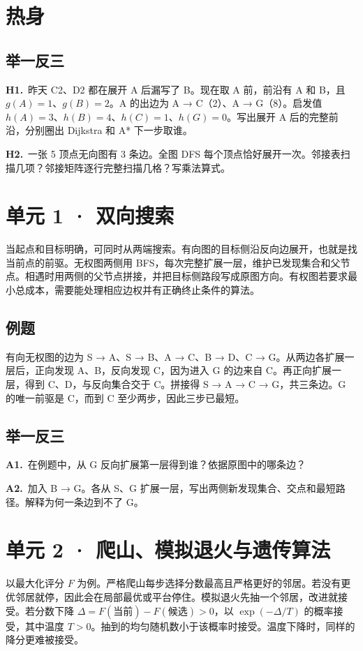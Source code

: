 \documentclass[UTF8,a4paper,11pt]{ctexart}
\newcommand{\CompactQuestion}[2]{\par\noindent\textbf{#1.}\ #2\par\vspace{.8em}}
\begin{document}
\section{热身}
\subsection{举一反三}
\CompactQuestion{H1}{昨天 C2、D2 都在展开 A 后漏写了 B。现在取 A 前，前沿有 A 和 B，且 $g(A)=1$、$g(B)=2$。A 的出边为 A → C（2）、A → G（8）。启发值 $h(A)=3$、$h(B)=4$、$h(C)=1$、$h(G)=0$。写出展开 A 后的完整前沿，分别圈出 Dijkstra 和 A* 下一步取谁。}
\CompactQuestion{H2}{一张 5 顶点无向图有 3 条边。全图 DFS 每个顶点恰好展开一次。邻接表扫描几项？邻接矩阵逐行完整扫描几格？写乘法算式。}
\clearpage
\section{单元 1 · 双向搜索}
当起点和目标明确，可同时从两端搜索。有向图的目标侧沿反向边展开，也就是找当前点的前驱。无权图两侧用 BFS，每次完整扩展一层，维护已发现集合和父节点。相遇时用两侧的父节点拼接，并把目标侧路段写成原图方向。有权图若要求最小总成本，需要能处理相应边权并有正确终止条件的算法。

\subsection{例题}
有向无权图的边为 S → A、S → B、A → C、B → D、C → G。从两边各扩展一层后，正向发现 A、B，反向发现 C，因为进入 G 的边来自 C。再正向扩展一层，得到 C、D，与反向集合交于 C。拼接得 S → A → C → G，共三条边。G 的唯一前驱是 C，而到 C 至少两步，因此三步已最短。

\subsection{举一反三}
\CompactQuestion{A1}{在例题中，从 G 反向扩展第一层得到谁？依据原图中的哪条边？}
\CompactQuestion{A2}{加入 B → G。各从 S、G 扩展一层，写出两侧新发现集合、交点和最短路径。解释为何一条边到不了 G。}
\clearpage
\section{单元 2 · 爬山、模拟退火与遗传算法}
以最大化评分 $F$ 为例。严格爬山每步选择分数最高且严格更好的邻居。若没有更优邻居就停，因此会在局部最优或平台停住。模拟退火先抽一个邻居，改进就接受。若分数下降 $\Delta=F(\text{当前})-F(\text{候选})>0$，以 $\exp(-\Delta/T)$ 的概率接受，其中温度 $T>0$。抽到的均匀随机数小于该概率时接受。温度下降时，同样的降分更难被接受。
\end{document}
